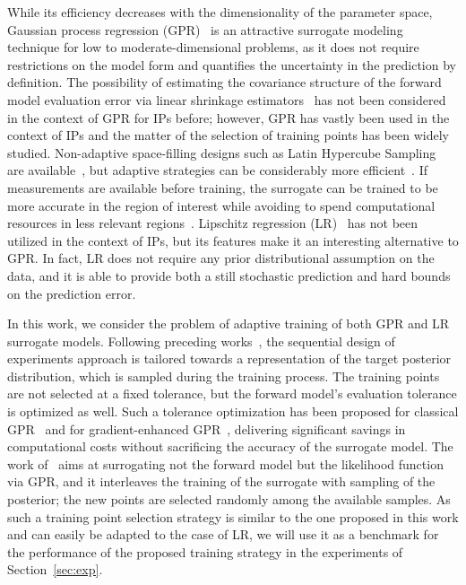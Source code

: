 While its efficiency decreases with the dimensionality of the parameter space, Gaussian process regression (GPR)~\cite{RasmussenWilliams2006} is an attractive surrogate modeling technique for low to moderate-dimensional problems, as it does not require restrictions on the model form and quantifies the uncertainty in the prediction by definition.
The possibility of estimating the covariance structure of the forward model evaluation error via linear shrinkage estimators~\cite{LedoitWolf2004b} has not been considered in the context of GPR for IPs before; however, GPR has vastly been used in the context of IPs and the matter of the selection of training points has been widely studied.
Non-adaptive space-filling designs such as Latin Hypercube Sampling~\cite{McKayBeckmanConover1979} are available~\cite{Giunta}, but adaptive strategies can be considerably more efficient~\cite{Crombecq}.
If measurements are available before training, the surrogate can be trained to be more accurate in the region of interest while avoiding to spend computational resources in less relevant regions~\cite{SinsbeckNowak2017, WangBroccardo2020}.
Lipschitz regression (LR)~\cite{ZabinskySmithKristinsdottir2003,Calliess2017} has not been utilized in the context of IPs, but its features make it an interesting alternative to GPR.
In fact, LR does not require any prior distributional assumption on the data, and it is able to provide both a still stochastic prediction and hard bounds on the prediction error.\medskip

In this work, we consider the problem of adaptive training of both GPR and LR surrogate models.
Following preceding works~\cite{VillaniUngerWeiser2024,VillaniArconesUngerWeiser2025}, the sequential design of experiments approach is tailored towards a representation of the target posterior distribution, which is sampled during the training process. 
The training points are not selected at a fixed tolerance, but the forward model's evaluation tolerance is optimized as well. 
Such a tolerance optimization has been proposed for classical GPR~\cite{SemlerWeiser2023} and for gradient-enhanced GPR~\cite{SemlerWeiser2024}, delivering significant savings in computational costs without sacrificing the accuracy of the surrogate model.
The work of~\cite{Dinkel2024} aims at surrogating not the forward model but the likelihood function via GPR, and it interleaves the training of the surrogate with sampling of the posterior; the new points are selected randomly among the available samples. 
As such a training point selection strategy is similar to the one proposed in this work and can easily be adapted to the case of LR, we will use it as a benchmark for the performance of the proposed training strategy in the experiments of Section~\ref{sec:exp}.